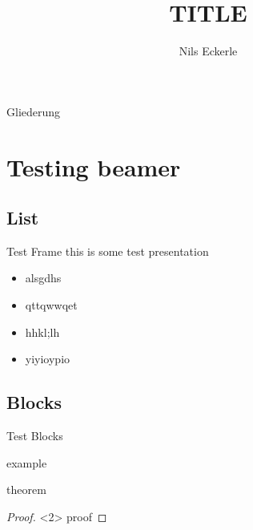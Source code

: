 

\title{TITLE}
\author{Nils Eckerle}
\date{}



	\maketitle

\begin{frame}{Gliederung}
	\tableofcontents
\end{frame}

\section{Testing beamer}

\subsection{List}

\begin{frame}{Test Frame}
	this is some test presentation
	\begin{itemize}
		\item<1-> alsgdhs
		\item<2-> qttqwwqet
		\item<3-> hhkl;lh
		\item<4-> yiyioypio
	\end{itemize}


\end{frame}

\subsection{Blocks}

\begin{frame}{Test Blocks}
	\begin{example}
		example
	\end{example}
	\begin{theorem}[Pythagoras]
		theorem
	\end{theorem}
  \begin{proof}<2>
		proof
	\end{proof}
\end{frame}

